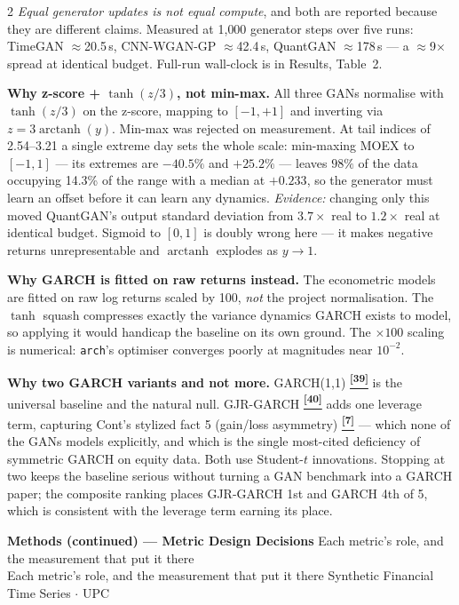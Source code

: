 \documentclass[10pt]{article}
\newcommand{\pagehead}[2]{%
  \begin{tcolorbox}[enhanced,arc=0pt,outer arc=0pt,boxrule=0pt,
    colback=Navy,colframe=Navy,
    top=5pt,bottom=5pt,left=8pt,right=8pt,
    before skip=0pt,after skip=10pt]
  {\color{white}\large\bfseries #1}%
  \ifx\relax#2\relax\else\\[1pt]{\color{blue!30!white}\small #2}\fi
  \hfill{\color{blue!20!white}\footnotesize Synthetic Financial Time Series $\cdot$ UPC}
  \end{tcolorbox}}
\newcommand{\tcite}[1]{%
  \hyperlink{R:#1}{\textsuperscript{\scriptsize\textbf{[#1]}}}}
\begin{document}
\begin{multicols}{2}
\textit{Equal generator updates is not equal compute}, and both are reported because they are different claims. Measured at 1{,}000 generator steps over five runs: TimeGAN $\approx$20.5\,s, CNN-WGAN-GP $\approx$42.4\,s, QuantGAN $\approx$178\,s --- a $\approx$9$\times$ spread at identical budget. Full-run wall-clock is in Results, Table~2.

\smallskip
\textbf{Why z-score + $\tanh(z/3)$, not min-max.}
All three GANs normalise with $\tanh(z/3)$ on the z-score, mapping to $[-1,+1]$ and inverting via $z = 3\operatorname{arctanh}(y)$. Min-max was rejected on measurement. At tail indices of 2.54--3.21 a single extreme day sets the whole scale: min-maxing MOEX to $[-1,1]$ --- its extremes are \(-40.5\%\) and \(+25.2\%\) --- leaves $98\%$ of the data occupying 14.3\% of the range with a median at \(+0.233\), so the generator must learn an offset before it can learn any dynamics. \textit{Evidence:} changing only this moved QuantGAN's output standard deviation from $3.7\times$ real to $1.2\times$ real at identical budget. Sigmoid to $[0,1]$ is doubly wrong here --- it makes negative returns unrepresentable and $\operatorname{arctanh}$ explodes as $y\to1$.

\smallskip
\textbf{Why GARCH is fitted on raw returns instead.}
The econometric models are fitted on raw log returns scaled by 100, \emph{not} the project normalisation. The $\tanh$ squash compresses exactly the variance dynamics GARCH exists to model, so applying it would handicap the baseline on its own ground. The $\times100$ scaling is numerical: \texttt{arch}'s optimiser converges poorly at magnitudes near $10^{-2}$.

\smallskip
\textbf{Why two GARCH variants and not more.}
GARCH(1,1)\tcite{39} is the universal baseline and the natural null. GJR-GARCH\tcite{40} adds one leverage term, capturing Cont's stylized fact 5 (gain/loss asymmetry)\tcite{7} --- which none of the GANs models explicitly, and which is the single most-cited deficiency of symmetric GARCH on equity data. Both use Student-$t$ innovations. Stopping at two keeps the baseline serious without turning a GAN benchmark into a GARCH paper; the composite ranking places GJR-GARCH 1st and GARCH 4th of 5, which is consistent with the leverage term earning its place.

\end{multicols}

\clearpage

\pagehead{Methods (continued) --- Metric Design Decisions}
         {Each metric's role, and the measurement that put it there}
\end{document}
